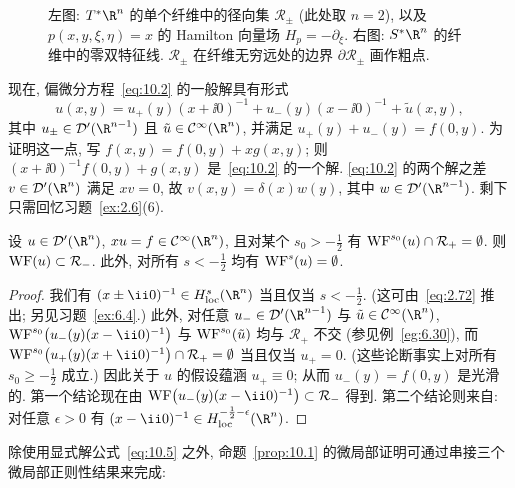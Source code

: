 \begin{figure}[htbp]
\centering
\drawFigTenOne
\caption{左图: $T^* \R^n$ 的单个纤维中的径向集 $\mathcal{R}_\pm$ (此处取 $n = 2$), 以及 $p(x, y, \xi, \eta) = x$ 的 Hamilton 向量场 $H_p = -\partial_\xi$. 右图: $S^* \R^n$ 的纤维中的零双特征线. $\mathcal{R}_\pm$ 在纤维无穷远处的边界 $\partial\mathcal{R}_\pm$ 画作粗点.}
\label{fig:10.1}
\end{figure}

现在, 偏微分方程~\eqref{eq:10.2} 的一般解具有形式
\begin{equation}\label{eq:10.5}
    u(x, y) = u_+(y) (x + \ii 0)^{-1} + u_-(y) (x - \ii 0)^{-1} + \tilde{u}(x, y),
\end{equation}
其中 $u_\pm \in \mathcal{D}'(\R^{n-1})$ 且 $\tilde{u} \in \Smooth(\R^n)$, 并满足 $u_+(y) + u_-(y) = f(0, y)$. 为证明这一点, 写 $f(x, y) = f(0, y) + x g(x, y)$; 则 $(x + \ii 0)^{-1} f(0, y) + g(x, y)$ 是~\eqref{eq:10.2} 的一个解. \eqref{eq:10.2} 的两个解之差 $v \in \mathcal{D}'(\R^n)$ 满足 $x v = 0$, 故 $v(x, y) = \delta(x) w(y)$, 其中 $w \in \mathcal{D}'(\R^{n-1})$. 剩下只需回忆习题~\ref{ex:2.6}(6).

\begin{proposition}[乘以 $x$]\label{prop:10.1}
设 $u \in \mathcal{D}'(\R^n)$, $x u = f \in \Smooth(\R^n)$, 且对某个 $s_0 > -\frac{1}{2}$ 有 $\operatorname{WF}^{s_0}(u) \cap \mathcal{R}_+ = \emptyset$. 则 $\operatorname{WF}(u) \subset \mathcal{R}_-$. 此外, 对所有 $s < -\frac{1}{2}$ 均有 $\operatorname{WF}^s(u) = \emptyset$.
\end{proposition}

\begin{proof}
我们有 $(x \pm \ii 0)^{-1} \in H_{\mathrm{loc}}^s(\R^n)$ 当且仅当 $s < -\frac{1}{2}$. (这可由~\eqref{eq:2.72} 推出; 另见习题~\ref{ex:6.4}.) 此外, 对任意 $u_- \in \mathcal{D}'(\R^{n-1})$ 与 $\tilde{u} \in \Smooth(\R^n)$, $\WF^{s_0}\bigl(u_-(y)(x - \ii 0)^{-1}\bigr)$ 与 $\operatorname{WF}^{s_0}(\tilde{u})$ 均与 $\mathcal{R}_+$ 不交 (参见例~\ref{eg:6.30}), 而 $\WF^{s_0}\bigl(u_+(y)(x + \ii 0)^{-1}\bigr) \cap \mathcal{R}_+ = \emptyset$ 当且仅当 $u_+ = 0$. (这些论断事实上对所有 $s_0 \ge -\frac{1}{2}$ 成立.) 因此关于 $u$ 的假设蕴涵 $u_+ \equiv 0$; 从而 $u_-(y) = f(0, y)$ 是光滑的. 第一个结论现在由 $\WF\bigl(u_-(y)(x - \ii 0)^{-1}\bigr) \subset \mathcal{R}_-$ 得到. 第二个结论则来自: 对任意 $\epsilon > 0$ 有 $(x - \ii 0)^{-1} \in H_{\mathrm{loc}}^{-\frac{1}{2}-\epsilon}(\R^n)$.
\end{proof}

除使用显式解公式~\eqref{eq:10.5} 之外, 命题~\ref{prop:10.1} 的微局部证明可通过串接三个微局部正则性结果来完成:

